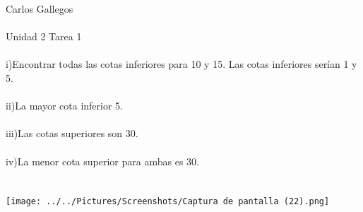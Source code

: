 \documentclass[a4paper,10pt]{article}
\title{}
\author{}
\date{}
\begin{document}
\maketitle
Carlos Gallegos\\\\
Unidad 2 Tarea 1\\\\
i)Encontrar todas las cotas inferiores para 10 y 15. Las cotas inferiores serían 1 y 5.\\\\
ii)La mayor cota inferior 5.\\\\
iii)Las cotas superiores son 30.\\\\
iv)La menor cota superior para ambas es 30.\\\\\\
\texttt{[image: ../../Pictures/Screenshots/Captura de pantalla (22).png]} 
\end{document}
